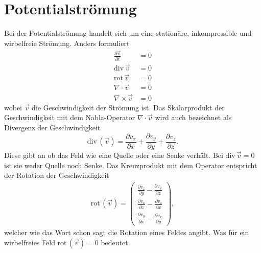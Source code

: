 %
%
%
%
\section{Potentialströmung\label{ueberschall:section:potentialstroemung}}
Bei der Potentialströmung handelt sich um eine stationäre, 
inkompressible und wirbelfreie Strömung.
Anders formuliert
\begin{align}
    \frac{\partial \vec{v}}{\partial t} &= 0 \\
    \mathrm{div}\,\vec{v} &= 0 \\
    \mathrm{rot}\,\vec{v} &= 0 \\
    \nabla \cdot \vec{v} &= 0 \\
    \nabla \times \vec{v} &= 0\label{equation:inkompressibel}
\end{align}
wobei $\vec{v}$ die Geschwindigkeit der Strömung ist.
Das Skalarprodukt der Geschwindigkeit mit dem Nabla-Operator $\nabla \cdot \vec{v}$ 
wird auch bezeichnet als Divergenz der Geschwindigkeit
\begin{equation}
    \mathrm{div}\,(\vec{v})
    =
    \frac{\partial v_x}{\partial x} +
    \frac{\partial v_y}{\partial y} +
    \frac{\partial v_z}{\partial z}.
\end{equation}
Diese gibt an ob das Feld wie eine Quelle oder eine Senke verhält.
Bei $\mathrm{div}\,\vec{v} = 0$ ist sie weder Quelle noch Senke.
Das Kreuzprodukt mit dem Operator entspricht
der Rotation der Geschwindigkeit
\begin{align}
    \mathrm{rot}\,(\vec{v})
    =
    \begin{pmatrix}
        \frac{\partial v_z}{\partial y} - \frac{\partial v_y}{\partial z} \\
        \frac{\partial v_x}{\partial z} - \frac{\partial v_z}{\partial x} \\
        \frac{\partial v_y}{\partial x} - \frac{\partial v_x}{\partial y}
    \end{pmatrix},
\end{align}
welcher wie das Wort schon sagt die Rotation eines Feldes angibt.
Was für ein wirbelfreies Feld $\mathrm{rot}\,(\vec{v}) = 0$ bedeutet.

